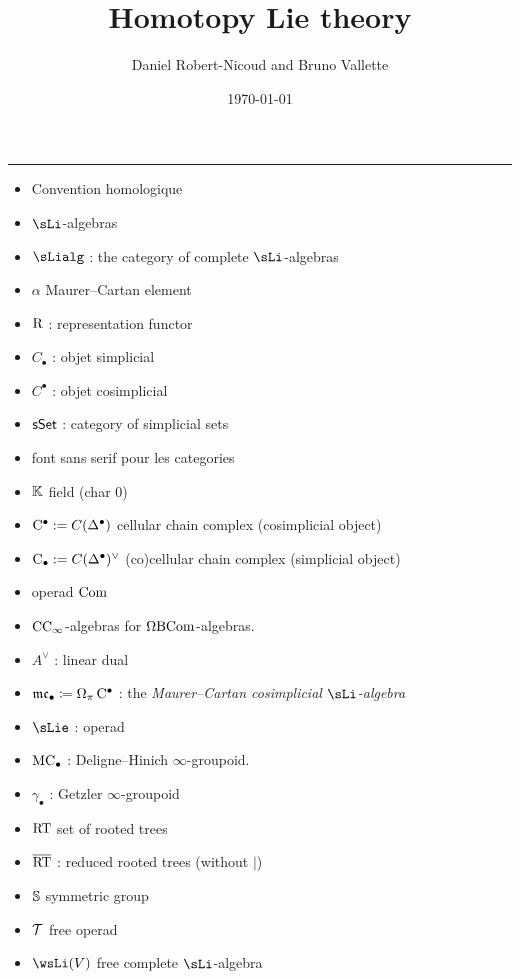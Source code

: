 \documentclass[twoside, 10pt]{amsart}
\author{Daniel Robert-Nicoud and Bruno Vallette}
\date{}
\title{Homotopy Lie theory}
\date{\today}
\begin{document}
\maketitle

\setcounter{tocdepth}{1}

\begin{abstract}
\end{abstract}

\tableofcontents

\hrule
\begin{itemize}
\item Convention homologique
\item $\sLi$-algebras
\item $\sLialg$ : the category of complete $\sLi$-algebras
\item $\alpha$ Maurer--Cartan element
\item $\mathrm{R}$ : representation functor 
\item $C_\bullet$ : objet simplicial
\item $C^\bullet$ : objet cosimplicial
\item $\mathsf{sSet}$ : category of simplicial sets 
\item font sans serif pour les categories 
\item $\mathbb{K}$ field (char $0$)
\item $\mathrm{C}^\bullet:=C(\mathrm{\Delta}^{\bullet})$ cellular chain complex (cosimplicial object)
\item $\mathrm{C}_\bullet:=C(\mathrm{\Delta}^{\bullet})^\vee$ (co)cellular chain complex (simplicial object)
\item operad $\mathrm{Com}$
\item $\mathrm{CC}_\infty$-algebras for $\Omega \mathrm{B} \mathrm{Com}$-algebras. 
\item $A^\vee$ : linear dual
\item $\mathfrak{mc}_\bullet\coloneqq \Omega_\pi \, \mathrm{C}^\bullet$ : the \emph{Maurer--Cartan cosimplicial $\sLi$-algebra}
\item $\sLie$ : operad
\item $\mathrm{MC}_\bullet$ : Deligne--Hinich $\infty$-groupoid. 
\item $\gamma_\bullet$ : Getzler $\infty$-groupoid
\item $\mathrm{RT}$ set of rooted trees
\item $\overline{\mathrm{RT}}$ : reduced rooted trees (without $|$)
\item $\mathbb{S}$ symmetric group
\item $\mathcal{T}$ free operad
\item $\wsLi(V)$ free complete $\sLi$-algebra 

\end{itemize}
\end{document}
